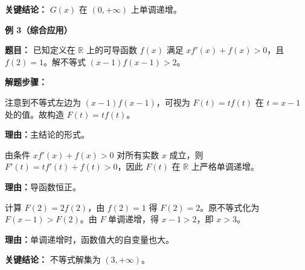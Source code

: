 \begin{examplebox}
	\textbf{\textcolor{CExample}{关键结论：}}
	$G(x)$ 在 $(0,+\infty)$ 上单调递增。

	\medskip
	\textbf{\textcolor{CExample}{例 3（综合应用）}}

	\textbf{\textcolor{CExample}{题目：}}
	已知定义在 $\mathbb{R}$ 上的可导函数 $f(x)$ 满足 $x f'(x)+f(x)>0$，且 $f(2)=1$。解不等式 $(x-1) f(x-1) > 2$。

	\textbf{\textcolor{CExample}{解题步骤：}}
	\begin{description}[style=nextline, leftmargin=2.8em, labelsep=0.5em, itemsep=0.45em]
		\item[\textbf{第一步（构造函数）：}] 注意到不等式左边为 $(x-1) f(x-1)$，可视为 $F(t)=t f(t)$ 在 $t=x-1$ 处的值。故构造 $F(t)=t f(t)$。
			\par\textbf{理由：}主结论的形式。
		\item[\textbf{第二步（单调性分析）：}] 由条件 $x f'(x)+f(x)>0$ 对所有实数 $x$ 成立，则 $F'(t)=t f'(t)+f(t)>0$，因此 $F(t)$ 在 $\mathbb{R}$ 上严格单调递增。
			\par\textbf{理由：}导函数恒正。
		\item[\textbf{第三步（转化求解）：}] 计算 $F(2)=2 f(2)$，由 $f(2)=1$ 得 $F(2)=2$。原不等式化为 $F(x-1) > F(2)$。由 $F$ 单调递增，得 $x-1 > 2$，即 $x>3$。
			\par\textbf{理由：}单调递增时，函数值大的自变量也大。
	\end{description}

	\textbf{\textcolor{CExample}{关键结论：}}
	不等式解集为 $(3,+\infty)$。

\end{examplebox}
